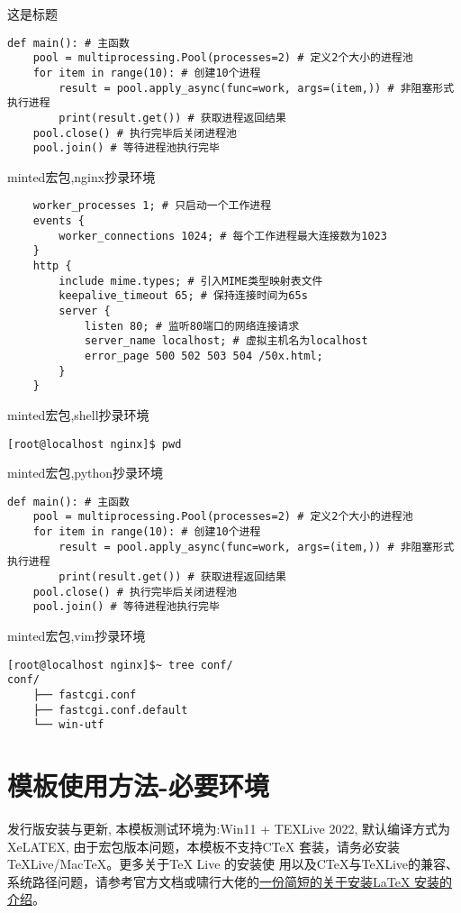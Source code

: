 \begin{macboxd}{这是标题}
\begin{lstlisting}[style=python3]
def main(): # 主函数
    pool = multiprocessing.Pool(processes=2) # 定义2个大小的进程池
    for item in range(10): # 创建10个进程
        result = pool.apply_async(func=work, args=(item,)) # 非阻塞形式执行进程
        print(result.get()) # 获取进程返回结果
    pool.close() # 执行完毕后关闭进程池
    pool.join() # 等待进程池执行完毕
\end{lstlisting}
\end{macboxd}


minted宏包,nginx抄录环境
\begin{verbatim}
    worker_processes 1; # 只启动一个工作进程
    events {
        worker_connections 1024; # 每个工作进程最大连接数为1023
    }
    http {
        include mime.types; # 引入MIME类型映射表文件
        keepalive_timeout 65; # 保持连接时间为65s
        server {
            listen 80; # 监听80端口的网络连接请求
            server_name localhost; # 虚拟主机名为localhost
            error_page 500 502 503 504 /50x.html;
        }
    }
\end{verbatim}

minted宏包,shell抄录环境
\begin{verbatim}
[root@localhost nginx]$ pwd
\end{verbatim}

minted宏包,python抄录环境
\begin{verbatim}
def main(): # 主函数
    pool = multiprocessing.Pool(processes=2) # 定义2个大小的进程池
    for item in range(10): # 创建10个进程
        result = pool.apply_async(func=work, args=(item,)) # 非阻塞形式执行进程
        print(result.get()) # 获取进程返回结果
    pool.close() # 执行完毕后关闭进程池
    pool.join() # 等待进程池执行完毕
\end{verbatim}

minted宏包,vim抄录环境
\begin{verbatim}
[root@localhost nginx]$~ tree conf/
conf/
    ├── fastcgi.conf
    ├── fastcgi.conf.default
    └── win-utf
\end{verbatim}

\section{模板使用方法-必要环境}

发行版安装与更新, 本模板测试环境为:Win11 + TEXLive 2022, 默认编译方式为XeLATEX,
由于宏包版本问题，本模板不支持C\TeX{} 套装，请务必安装\TeX Live/Mac\TeX{}。更多关于\TeX{} Live 的安装使
用以及C\TeX{}与\TeX Live的兼容、系统路径问题，请参考官方文档或啸行大佬的\href{https://github.com/OsbertWang/install-latex-guide-zh-cn/releases/}{一份简短的关于安装\LaTeX{} 安装的介绍}。

